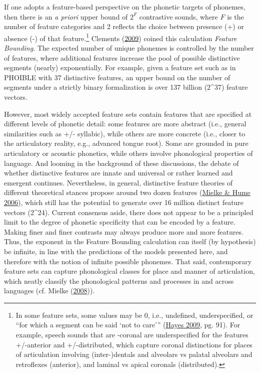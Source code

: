 \documentclass[
]{article}
\begin{document}
If one adopts a feature-based perspective on the phonetic targets of
phonemes, then there is an \emph{a priori} upper bound of \(2^F\)
contrastive sounds, where \(F\) is the number of feature categories and
2 reflects the choice between presence (+) or absence (-) of that
feature.\footnote{In some feature sets, some values may be 0, i.e.,
  undefined, underspecified, or ``for which a segment can be said `not
  to care''' (\protect\hyperlink{ref-Hayes2009}{Hayes 2009}, pg. 91).
  For example, speech sounds that are -coronal are underspecified for
  the features +/-anterior and +/-distributed, which capture coronal
  distinctions for places of articulation involving (inter-)dentals and
  alveolars vs palatal alveolars and retroflexes (anterior), and laminal
  vs apical coronals (distributed).} Clements
(\protect\hyperlink{ref-Clements2009}{2009}) coined this calculation
\emph{Feature Bounding}. The expected number of unique phonemes is
controlled by the number of features, where additional features increase
the pool of possible distinctive segments (nearly) exponentially. For
example, given a feature set such as in PHOIBLE with 37 distinctive
features, an upper bound on the number of segments under a strictly
binary formalization is over 137 billion (2\^{}37) feature vectors.

However, most widely accepted feature sets contain features that are
specified at different levels of phonetic detail: some features are more
abstract (i.e., general similarities such as +/- syllabic), while others
are more concrete (i.e., closer to the articulatory reality, e.g.,
advanced tongue root). Some are grounded in pure articulatory or
acoustic phonetics, while others involve phonological properties of
language. And looming in the background of these discussions, the debate
of whether distinctive features are innate and universal or rather
learned and emergent continues. Nevertheless, in general, distinctive
feature theories of different theoretical stances propose around two
dozen features (\protect\hyperlink{ref-MielkeHume2006}{Mielke \& Hume
2006}), which still has the potential to generate over 16 million
distinct feature vectors (2\^{}24). Current consensus aside, there does
not appear to be a principled limit to the degree of phonetic
specificity that can be encoded by a feature. Making finer and finer
contrasts may always produce more and more features. Thus, the exponent
in the Feature Bounding calculation can itself (by hypothesis) be
infinite, in line with the predictions of the models presented here, and
therefore with the notion of infinite possible phonemes. That said,
contemporary feature sets can capture phonological classes for place and
manner of articulation, which neatly classify the phonological patterns
and processes in and across languages (cf. Mielke
(\protect\hyperlink{ref-Mielke2008}{2008})).
\end{document}
